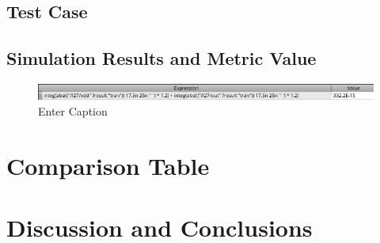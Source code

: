 \documentclass[12pt]{article}
\begin{document}
\newpage

\subsection{Test Case}



\newpage

\subsection{Simulation Results and Metric Value}

\begin{figure}
    \centering
    \includegraphics[width=0.5\linewidth]{writeup//figures/optimized_energy_val.png}
    \caption{Enter Caption}
\end{figure}
\newpage

\section{Comparison Table}



\newpage

\section{Discussion and Conclusions}
\end{document}
